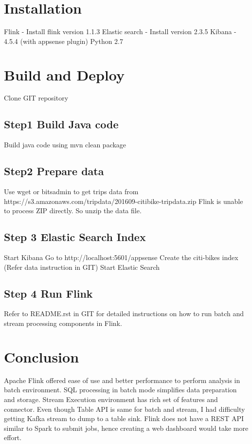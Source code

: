 \documentclass{sig-alternate-05-2015}
\begin{document}
\section {Installation}
Flink - Install flink version 1.1.3 
\break
Elastic search - Install version 2.3.5
\break
Kibana - 4.5.4 (with appsense plugin)
Python 2.7\break

\section {Build and Deploy}

Clone GIT repository

\subsection {Step1 Build Java code}
Build java code using \break
mvn clean package

\subsection {Step2 Prepare data}
Use wget or bitsadmin to get trips data from \break
https://s3.amazonaws.com/tripdata/201609-citibike-tripdata.zip
\break
Flink is unable to process ZIP directly. So unzip the data file.


\subsection {Step 3 Elastic Search Index}
Start Kibana
Go to http://localhost:5601/appsense
Create the citi-bikes index (Refer data instruction in GIT)
Start Elastic Search


\subsection {Step 4 Run Flink}
Refer to README.rst in GIT for detailed instructions on how 
to run batch and stream processing components in Flink.
\break
\break

\section {Conclusion}
Apache Flink offered ease of use and better performance to perform analysis in batch environment. SQL processing in batch mode simplifies data preparation and storage.
\break
Stream Execution environment has rich set of features and connector. Even though Table API is same for batch and stream, I had difficulty getting Kafka stream to dump to a table sink.   
\break
Flink does not have a REST API similar to Spark to submit jobs, hence creating a web dashboard would take more effort.


 
\end{document}
